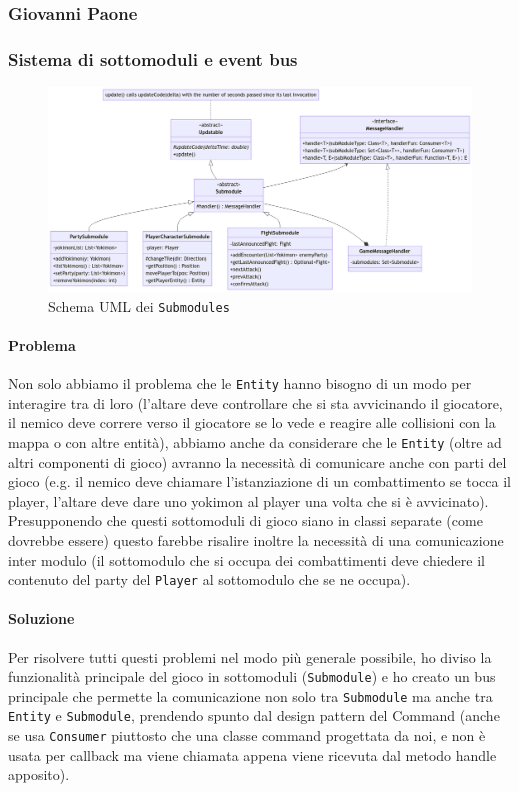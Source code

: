 \documentclass[a4paper,12pt]{report}
\begin{document}
\subsubsection{Giovanni Paone}
\subsubsection{Sistema di sottomoduli e event bus}
\begin{figure}[H]
\centering{}
\includegraphics[width=1.0\columnwidth]{images/uml-submodules.png}
\caption{Schema UML dei \texttt{Submodules}}
\label{img:uml-submodules}
\end{figure}
\paragraph{Problema} Non solo abbiamo il problema che le \texttt{Entity} hanno bisogno di un modo per interagire tra di loro (l’altare deve controllare che si sta avvicinando il giocatore, il nemico deve correre verso il giocatore se lo vede e reagire alle collisioni con la mappa o con altre entità), abbiamo anche da considerare che le \texttt{Entity} (oltre ad altri componenti di gioco) avranno la necessità di comunicare anche con parti del gioco (e.g. il nemico deve chiamare l’istanziazione di un combattimento se tocca il player, l’altare deve dare uno yokimon al player una volta che si è avvicinato). 
%
Presupponendo che questi sottomoduli di gioco siano in classi separate (come dovrebbe essere) questo farebbe risalire inoltre la necessità di una comunicazione inter modulo (il sottomodulo che si occupa dei combattimenti deve chiedere il contenuto del party del \texttt{Player} al sottomodulo che se ne occupa).
\paragraph{Soluzione} Per risolvere tutti questi problemi nel modo più generale possibile, ho diviso la funzionalità principale del gioco in sottomoduli (\texttt{Submodule}) e ho creato un bus principale che permette la comunicazione non solo tra \texttt{Submodule} ma anche tra \texttt{Entity} e \texttt{Submodule}, prendendo spunto dal design pattern del Command (anche se usa \texttt{Consumer} piuttosto che una classe command progettata da noi, e non è usata per callback ma viene chiamata appena viene ricevuta dal metodo handle apposito).
\end{document}
